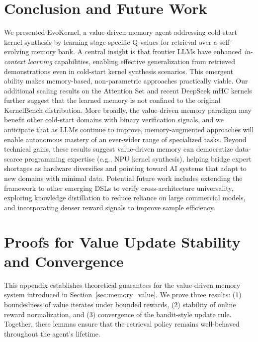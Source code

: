 \documentclass{article} %
\makeatletter
\providecommand{\FloatBarrier}{%
  \ifx\@deferlist\@empty\else\clearpage\fi}
\newcommand{\ourmethod}{EvoKernel\xspace}
\theoremstyle{definition}
\theoremstyle{remark}
\makeatother
\begin{document}
\FloatBarrier
\section{Conclusion and Future Work}

We presented \ourmethod, a value-driven memory agent addressing cold-start kernel synthesis by learning stage-specific Q-values for retrieval over a self-evolving memory bank. A central insight is that frontier LLMs have enhanced \emph{in-context learning} capabilities, enabling effective generalization from retrieved demonstrations even in cold-start kernel synthesis scenarios. This emergent ability makes memory-based, non-parametric approaches practically viable. Our additional scaling results on the Attention Set and recent DeepSeek mHC kernels further suggest that the learned memory is not confined to the original KernelBench distribution. More broadly, the value-driven memory paradigm may benefit other cold-start domains with binary verification signals, and we anticipate that as LLMs continue to improve, memory-augmented approaches will enable autonomous mastery of an ever-wider range of specialized tasks.
Beyond technical gains, these results suggest value-driven memory can democratize data-scarce programming expertise (e.g., NPU kernel synthesis), helping bridge expert shortages as hardware diversifies and pointing toward AI systems that adapt to new domains with minimal data.
Potential future work includes extending the framework to other emerging DSLs to verify cross-architecture universality, exploring knowledge distillation to reduce reliance on large commercial models, and incorporating denser reward signals to improve sample efficiency.

\newpage



\newpage
\appendix


  \section{Proofs for Value Update Stability and Convergence}
  \label{app:proofs}

  This appendix establishes theoretical guarantees for the value-driven memory system introduced in Section~\ref{sec:memory_value}. We prove three results: (1) boundedness of value iterates under bounded rewards, (2) stability of online reward normalization, and (3) convergence of the bandit-style update rule. Together, these lemmas ensure that the retrieval policy remains well-behaved throughout the agent's lifetime.
\end{document}
